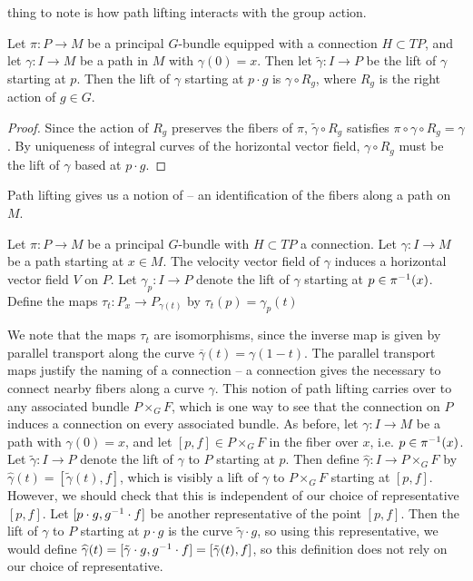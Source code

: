 thing to note is how path lifting interacts with the group action.
%
\begin{prop}
Let $\pi : P \to M$ be a principal $G$-bundle equipped with a connection
$H \subset TP$, and let $\gamma : I \to M$ be a path in $M$ with $\gamma(0) = x$.
Then let $\tilde{\gamma} : I \to P$ be the lift of $\gamma$ starting at $p$.
Then the lift of $\gamma$ starting at $p \cdot g$ is $\gamma \circ R_g$,
where $R_g$ is the right action of $g \in G$.
\end{prop}
%
\begin{proof}
Since the action of $R_g$ preserves the fibers of $\pi$,
$\tilde{\gamma} \circ R_g$ satisfies $\pi \circ \gamma \circ R_g = \gamma$.
By uniqueness of integral curves of the horizontal vector field,
$\gamma \circ R_g$ must be the lift of $\gamma$ based at $p \cdot g$.
\end{proof}
%
Path lifting gives us a notion of  -- an identification of
the fibers along a path on $M$.
%
\begin{defn}
Let $\pi : P \to M$ be a principal $G$-bundle with $H \subset TP$ a connection.
Let $\gamma : I \to M$ be a path starting at $x \in M$. The velocity vector
field of $\gamma$ induces a horizontal vector field $V$ on $P$. Let
$\gamma_p : I \to P$ denote the lift of $\gamma$ starting at $p \in \pi^{-1}(x)$.
Define the  maps $\tau_t : P_x \to P_{\gamma(t)}$ by
$\tau_t(p) = \gamma_p(t)$
\end{defn}
%
We note that the maps $\tau_t$ are isomorphisms, since the inverse map is given
by parallel transport along the curve $\overline{\gamma}(t) = \gamma(1-t)$.
The parallel transport maps justify the naming of a connection -- a connection
gives the necessary to connect nearby fibers along a curve $\gamma$.
This notion of path lifting carries over to any associated bundle $P \times_G F$,
which is one way to see that the connection on $P$ induces a connection on
every associated bundle. As before, let $\gamma : I \to M$ be a path
with $\gamma(0) = x$, and let $[p,f] \in P \times_G F$ in the fiber over $x$,
i.e. $p \in \pi^{-1}(x)$. Let $\tilde{\gamma} : I \to P$ denote the lift
of $\gamma$ to $P$ starting at $p$. Then define
$\widehat{\gamma} : I \to P \times_G F$ by
$\widehat{\gamma}(t) = [\tilde{\gamma}(t), f]$, which is visibly a lift of
$\gamma$ to $P \times_G F$ starting at $[p,f]$. However, we should check that
this is independent of our choice of representative $[p,f]$. Let
$[p\cdot g, g^{-1} \cdot f]$ be another representative of the point $[p,f]$.
Then the lift of $\gamma$ to $P$ starting at $p \cdot g$ is the curve
$\tilde{\gamma} \cdot g$, so using this representative, we would define
$\widehat{\gamma}(t) = [\tilde{\gamma} \cdot g, g^{-1} \cdot f] =
[\tilde{\gamma}(t), f]$, so this definition does not rely on our choice of
representative. \\

